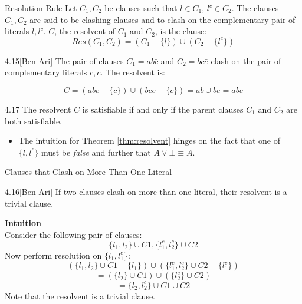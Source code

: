 \documentclass[style=sailor,size=12pt]{powerdot}
\begin{document}
\begin{wideslide}[bm=,toc=]{Resolution Rule}
Let $C_1, C_2$ be clauses such that $l \in C_1$, $l^c \in C_2$. The clauses
$C_1,C_2$ are said to be clashing clauses and to clash on the complementary
pair of literals $l,l^c$. $C$, the resolvent of $C_1$ and $C_2$, is the
clause:\\
\[ 
  Res(C_1,C_2) = (C_1 - \{l\}) \cup (C_2 - \{l^c\})
\]
\pause
\begin{ex}{4.15}[Ben Ari]
The pair of clauses $C_1 = ab\bar{c}$ and $C_2 = bc\bar{e}$ clash on the pair
of complementary literals $c, \bar{c}$. The resolvent is:

\[ 
  C = (ab\bar{c} - \{\bar{c}\}) \cup (bc\bar{e} - \{c\}) = ab\cup b\bar{e} = ab\bar{e}
  \]

\end{ex}
\pause
\begin{thm}{4.17}\label{thm:resolvent}
The resolvent $C$ is satisfiable if and only if the parent clauses $C_1$ and
$C_2$ are both satisfiable.
\end{thm}
\pause
\begin{itemize}
\item The intuition for Theorem \ref{thm:resolvent} hinges on the fact that one of 
$\{l,l^c\}$ must be \emph{false} and further that $A \lor \bot \equiv A$.
\end{itemize}
\end{wideslide}

\begin{wideslide}[bm=,toc=]{Clauses that Clash on More Than One Literal}
\begin{lem}{4.16}[Ben Ari]
If two clauses clash on more than one literal, their resolvent is a trivial
clause.
\end{lem}
\pause
{ \bf \underline{Intuition}}\\
Consider the following pair of clauses:
\[
  \{l_1, l_2\} \cup C1,  \{l_1^c, l_2^c\} \cup C2
  \]
\pause
Now perform resolution on $\{l_1, l_1^c\}$: 
\pause
\[
  (\{l_1, l_2\} \cup C1 - \{l_1\})\cup (\{l_1^c, l_2^c\} \cup C2 - \{l_1^c \})
\]
\pause
\[
  = (\{l_2\} \cup C1) \cup (\{l_2^c\} \cup C2)
\]
\pause
\[
  = \{l_2, l_2^c\} \cup C1 \cup C2
\]
\pause
Note that the resolvent is a trivial clause.
\end{wideslide}
\end{document}
